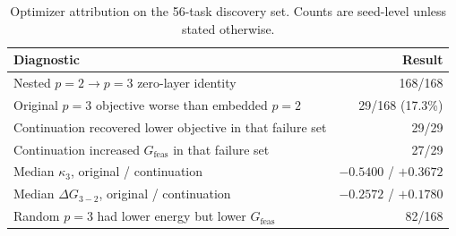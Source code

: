 
\begin{table}[t]
\centering
\caption{Optimizer attribution on the 56-task discovery set. Counts are seed-level unless stated otherwise.}
\label{tab:optimizer-attribution}
\small
\begin{tabularx}{\textwidth}{@{}Xr@{}}
\toprule
Diagnostic & Result \\
\midrule
Nested $p=2\to p=3$ zero-layer identity & 168/168 \\
Original $p=3$ objective worse than embedded $p=2$ & 29/168 (17.3\%) \\
Continuation recovered lower objective in that failure set & 29/29 \\
Continuation increased $G_{\mathrm{feas}}$ in that failure set & 27/29 \\
Median $\kappa_3$, original / continuation & $-0.5400$ / $+0.3672$ \\
Median $\Delta G_{3-2}$, original / continuation & $-0.2572$ / $+0.1780$ \\
Random $p=3$ had lower energy but lower $G_{\mathrm{feas}}$ & 82/168 \\
\bottomrule
\end{tabularx}
\end{table}
